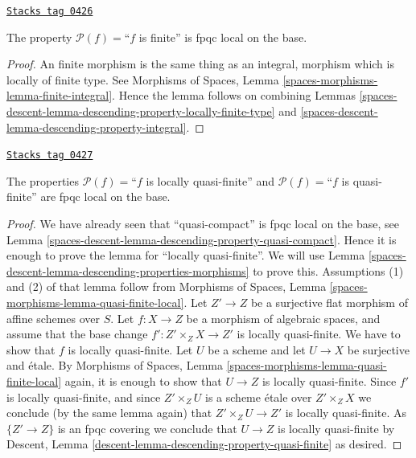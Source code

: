 \begin{lemma}
\label{spaces-descent-lemma-descending-property-finite}
\href{https://stacks.math.columbia.edu/tag/0426}{\texttt{Stacks tag 0426}}

The property $\mathcal{P}(f) =$``$f$ is finite''
is fpqc local on the base.
\end{lemma}

\begin{proof}
An finite morphism is the same thing as an integral,
morphism which is locally of finite type. See
Morphisms of Spaces, Lemma \ref{spaces-morphisms-lemma-finite-integral}.
Hence the lemma follows on combining
Lemmas \ref{spaces-descent-lemma-descending-property-locally-finite-type}
and \ref{spaces-descent-lemma-descending-property-integral}.
\end{proof}

\begin{lemma}
\label{spaces-descent-lemma-descending-property-quasi-finite}
\href{https://stacks.math.columbia.edu/tag/0427}{\texttt{Stacks tag 0427}}

The properties
$\mathcal{P}(f) =$``$f$ is locally quasi-finite''
and
$\mathcal{P}(f) =$``$f$ is quasi-finite''
are fpqc local on the base.
\end{lemma}

\begin{proof}
We have already seen that ``quasi-compact'' is fpqc local on the base, see
Lemma \ref{spaces-descent-lemma-descending-property-quasi-compact}. Hence it is enough
to prove the lemma for ``locally quasi-finite''. We will use
Lemma \ref{spaces-descent-lemma-descending-properties-morphisms}
to prove this. Assumptions (1) and (2) of that lemma follow from
Morphisms of Spaces,
Lemma \ref{spaces-morphisms-lemma-quasi-finite-local}.
Let $Z' \to Z$ be a surjective flat morphism of affine schemes over $S$.
Let $f : X \to Z$ be a morphism of algebraic spaces, and assume
that the base change $f' : Z' \times_Z X \to Z'$ is locally quasi-finite.
We have to show that $f$ is locally quasi-finite. Let $U$ be a scheme
and let $U \to X$ be surjective and \'etale. By
Morphisms of Spaces,
Lemma \ref{spaces-morphisms-lemma-quasi-finite-local}
again, it is enough to show that $U \to Z$ is locally quasi-finite.
Since $f'$ is locally quasi-finite, and since $Z' \times_Z U$ is a
scheme \'etale over $Z' \times_Z X$ we conclude (by the same lemma again) that
$Z' \times_Z U \to Z'$ is locally quasi-finite.
As $\{Z' \to Z\}$ is an fpqc covering we conclude that
$U \to Z$ is locally quasi-finite by
Descent, Lemma \ref{descent-lemma-descending-property-quasi-finite}
as desired.
\end{proof}

